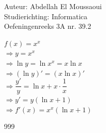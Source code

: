\documentclass[a4paper]{article}
\begin{document}
  
\noindent \large Auteur: Abdellah El Moussaoui \\
\noindent \large Studierichting: Informatica\\
\noindent \large Oefeningenreeks 3A nr. 39.2\\

\medskip

\normalsize

$f(x)=x^x$\\

$\Rightarrow y=x^x$\\

$\Rightarrow  \ln y=\ln x^x = x \ln x$\\

$\Rightarrow \left(\ln y\right)'= \left(x \ln x \right)'$\\

$\Rightarrow \dfrac{y'}{y} = \ln x + x \cdot \dfrac{1}{x}$\\

$\Rightarrow y' = y \left(\ln x + 1\right)$\\

$\Rightarrow \boxed{f'(x) = x^x \left(\ln x + 1\right)}$\\



\begin{thebibliography}{999}
\end{thebibliography}
\end{document}
